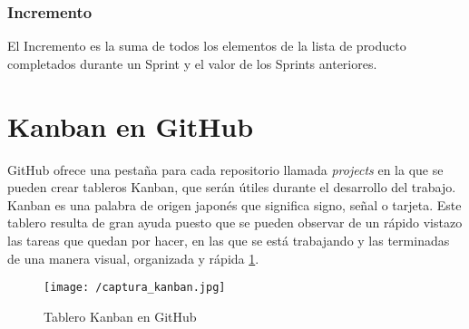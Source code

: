 \subsubsection{Incremento}
El Incremento \cite{Schwaber2017} es la suma de todos los elementos de la lista de producto completados durante un Sprint y el valor de los Sprints anteriores.

\newpage

\section{Kanban en GitHub}
GitHub ofrece una pestaña para cada repositorio llamada \textit{projects} en la que se pueden crear tableros Kanban, que serán útiles durante el desarrollo del trabajo. Kanban \cite{Gomez2017} es una palabra de origen japonés que significa signo, señal o tarjeta. Este tablero resulta de gran ayuda puesto que se pueden observar de un rápido vistazo las tareas que quedan por hacer, en las que se está trabajando y las terminadas de una manera visual, organizada y rápida \ref{fig:kanban}.

\begin{figure}[!h]
	\begin{center}
		\texttt{[image: /captura\_kanban.jpg]}
		\caption{Tablero Kanban en GitHub}
		\label{fig:kanban}
	\end{center}
\end{figure}